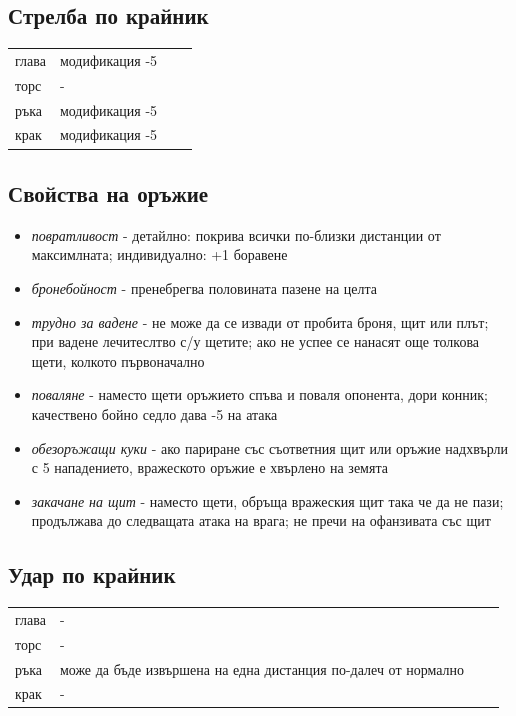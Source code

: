 \subsection{Стрелба по крайник}
\begin{tabular}{l | l | l | l }
глава & модификация -5  \\
торс  & -  \\
ръка & модификация -5  \\
крак & модификация -5  \\
\end{tabular}


\subsection{Свойства на оръжие}
\begin{itemize}
\item{\textit{повратливост} - детайлно: покрива всички по-близки дистанции от максимлната; индивидуално: +1 боравене }
\item{\textit{бронебойност} - пренебрегва половината пазене на целта}
\item{\textit{трудно за вадене} - не може да се извади от пробита броня, щит или плът; при вадене лечитеслтво с/у щетите; ако не успее се  нанасят още толкова щети, колкото първоначално}
\item{\textit{поваляне} - наместо щети оръжието спъва и поваля опонента, дори конник; качествено бойно седло дава -5 на атака}
\item{\textit{обезоръжащи куки} - ако париране със съответния щит или оръжие надхвърли с 5 нападението, вражеското оръжие е хвърлено на земята}
\item{\textit{закачане на щит} - наместо щети, обръща вражеския щит така че да не пази; продължава до следващата атака на врага; не пречи на офанзивата със щит}
\end{itemize}


\subsection{Удар по крайник}
\begin{tabular}{l | l | l | l }
глава & -  \\
торс  & -  \\
ръка  & може да бъде извършена на една дистанция по-далеч от нормално  \\
крак  & -  \\
\end{tabular}


